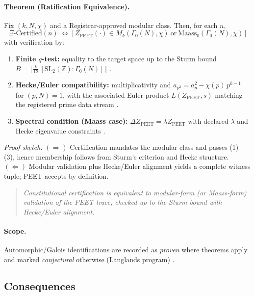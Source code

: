 \documentclass[12pt]{amsart}
\theoremstyle{plain}
\begin{document}
\paragraph{Theorem (Ratification Equivalence).}
Fix $(k,N,\chi)$ and a Registrar-approved modular class. Then, for each $n$,
\[
\Xi\text{-Certified}(n)
\ \Longleftrightarrow\
\Big[\,Z_{\mathrm{PEET}}(\cdot)\in M_k(\Gamma_0(N),\chi)\ \text{or}\ \text{Maass}_0(\Gamma_0(N),\chi)\,\Big]
\]
with verification by:
\begin{enumerate}
  \item \textbf{Finite $q$-test:} equality to the target space up to the Sturm bound
  \(
  B=\big\lceil \tfrac{k}{12}\,[\mathrm{SL}_2(\mathbb{Z}):\Gamma_0(N)]\big\rceil
  \)
  \cite{sturm1987congruence,diamond2005first}.
  \item \textbf{Hecke/Euler compatibility:} multiplicativity and $a_{p^2}=a_p^2-\chi(p)\,p^{k-1}$ for $(p,N)=1$, with the associated Euler product $L(Z_{\mathrm{PEET}},s)$ matching the registered prime data stream \cite{diamond2005first,serre1973course,godement1972zeta}.
  \item \textbf{Spectral condition (Maass case):} $\Delta Z_{\mathrm{PEET}}=\lambda Z_{\mathrm{PEET}}$ with declared $\lambda$ and Hecke eigenvalue constraints \cite{iwaniec2002spectral}.
\end{enumerate}
\emph{Proof sketch.} $(\Rightarrow)$ Certification mandates the modular class and passes (1)–(3), hence membership follows from Sturm’s criterion and Hecke structure. $(\Leftarrow)$ Modular validation plus Hecke/Euler alignment yields a complete witness tuple; PEET accepts by definition.

\begin{quote}
\textit{Constitutional certification is equivalent to modular-form (or Maass-form) validation of the PEET trace, checked up to the Sturm bound with Hecke/Euler alignment.}
\end{quote}

\paragraph{Scope.}
Automorphic/Galois identifications are recorded as \emph{proven} where theorems apply and marked \emph{conjectural} otherwise (Langlands program) \cite{langlands1970problems,harris2001geometry}.

\subsection{Consequences}
\end{document}
